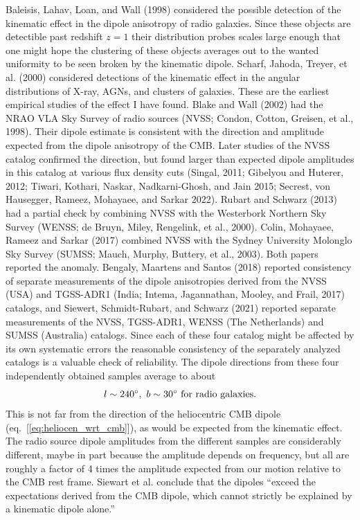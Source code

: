 \documentclass[fleqn,12pt]{article}
\newcommand{\beq}{\begin{equation}}
\newcommand{\eeq}{\end{equation}}
\begin{document}
Baleisis, Lahav, Loan, and Wall (1998) considered the possible detection of the kinematic  effect in the dipole anisotropy of radio galaxies. Since these objects are detectible past redshift $z=1$ their distribution probes scales large enough that one might hope the clustering of these objects averages out to the wanted uniformity to be seen broken by the kinematic dipole. Scharf, Jahoda, Treyer, et al. (2000) considered detections of the kinematic effect in the angular distributions of X-ray, AGNs, and clusters of galaxies. These are the earliest empirical studies of the effect I have found. Blake and Wall (2002) had the NRAO VLA Sky Survey of radio sources (NVSS; Condon, Cotton, Greisen, et al., 1998).  Their dipole estimate is consistent with the direction and amplitude expected from the dipole anisotropy of the CMB. Later studies of the NVSS catalog confirmed the direction, but found larger than expected dipole amplitudes in this catalog at various flux density cuts (Singal, 2011; Gibelyou and Huterer, 2012; Tiwari, Kothari, Naskar, Nadkarni-Ghosh, and Jain 2015; Secrest, von Hausegger, Rameez, Mohayaee, and Sarkar 2022). Rubart and Schwarz (2013) had a partial check by combining NVSS with the Westerbork Northern Sky Survey (WENSS; de Bruyn, Miley, Rengelink, et al., 2000). Colin, Mohayaee, Rameez and Sarkar (2017) combined NVSS with the Sydney University Molonglo Sky Survey (SUMSS; Mauch, Murphy, Buttery, et al., 2003). Both papers reported the anomaly. Bengaly, Maartens and Santos (2018) reported consistency of separate measurements of the dipole anisotropies derived from the NVSS (USA) and TGSS-ADR1 (India; Intema, Jagannathan, Mooley, and Frail, 2017) catalogs, and  Siewert, Schmidt-Rubart, and Schwarz (2021) reported separate measurements of the NVSS, TGSS-ADR1, WENSS (The Netherlands) and SUMSS (Australia) catalogs. Since each of these four catalog might be affected by its own systematic errors the reasonable consistency of the separately analyzed catalogs is a valuable check of reliability. The dipole directions from these four independently obtained samples average to about 
\beq
l\sim 240^\circ,\ b\sim 30^\circ\hbox{ for radio galaxies.}\label{eq:radiodipole}
\eeq
This is not far from the direction of the heliocentric CMB dipole (eq.~[\ref{eq:heliocen_wrt_cmb}]), as would be expected from the kinematic effect. The radio source dipole amplitudes from the different samples are considerably different, maybe in part  because the amplitude depends on frequency, but all are roughly a factor of 4 times the amplitude expected from our motion relative to the CMB rest frame. Siewart et al. conclude that the dipoles ``exceed the expectations derived from the CMB dipole, which cannot strictly be explained by a kinematic dipole alone.'' 
\end{document}
